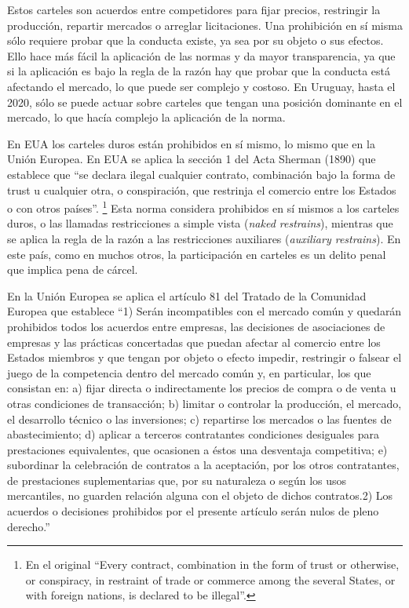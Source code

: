 \documentclass[
  12pt,
  spanish,
]{book}
\begin{document}
Estos carteles son acuerdos entre competidores para fijar precios, restringir la producción, repartir mercados o arreglar licitaciones. Una prohibición en sí misma sólo requiere probar que la conducta existe, ya sea por su objeto o sus efectos. Ello hace más fácil la aplicación de las normas y da mayor transparencia, ya que si la aplicación es bajo la regla de la razón hay que probar que la conducta está afectando el mercado, lo que puede ser complejo y costoso. En Uruguay, hasta el 2020, sólo se puede actuar sobre carteles que tengan una posición dominante en el mercado, lo que hacía complejo la aplicación de la norma.

En EUA los carteles duros están prohibidos en sí mismo, lo mismo que en la Unión Europea. En EUA se aplica la sección 1 del Acta Sherman (1890) que establece que ``se declara ilegal cualquier contrato, combinación bajo la forma de trust u cualquier otra, o conspiración, que restrinja el comercio entre los Estados o con otros países''.
\footnote{En el original ``Every contract, combination in the form of trust or otherwise, or conspiracy, in restraint of trade or commerce among the several States, or with foreign nations, is declared to be illegal''.}
Esta norma considera prohibidos en sí mismos a los carteles duros, o las llamadas restricciones a simple vista (\emph{naked restrains}), mientras que se aplica la regla de la razón a las restricciones auxiliares (\emph{auxiliary restrains}). En este país, como en muchos otros, la participación en carteles es un delito penal que implica pena de cárcel.

En la Unión Europea se aplica el artículo 81 del Tratado de la Comunidad Europea que establece ``1) Serán incompatibles con el mercado común y quedarán prohibidos todos los acuerdos entre empresas, las decisiones de asociaciones de empresas y las prácticas concertadas que puedan afectar al comercio entre los Estados miembros y que tengan por objeto o efecto impedir, restringir o falsear el juego de la competencia dentro del mercado común y, en particular, los que consistan en: a) fijar directa o indirectamente los precios de compra o de venta u otras condiciones de transacción; b) limitar o controlar la producción, el mercado, el desarrollo técnico o las inversiones; c) repartirse los mercados o las fuentes de abastecimiento; d) aplicar a terceros contratantes condiciones desiguales para prestaciones equivalentes, que ocasionen a éstos una desventaja competitiva; e) subordinar la celebración de contratos a la aceptación, por los otros contratantes, de prestaciones suplementarias que, por su naturaleza o según los usos mercantiles, no guarden relación alguna con el objeto de dichos contratos.2) Los acuerdos o decisiones prohibidos por el presente artículo serán nulos de pleno derecho.''
\end{document}
